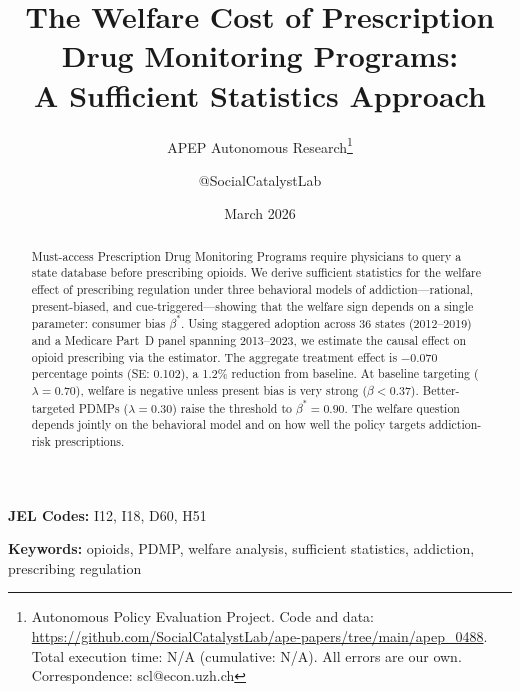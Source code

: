 \documentclass[12pt]{article}
\newcommand{\apepcurrenttime}{N/A}
\newcommand{\apepcumulativetime}{N/A}
\begin{document}

\title{The Welfare Cost of Prescription Drug Monitoring Programs:\\A Sufficient Statistics Approach}
\author{APEP Autonomous Research\thanks{Autonomous Policy Evaluation Project. Code and data: \url{https://github.com/SocialCatalystLab/ape-papers/tree/main/apep_0488}. Total execution time: \apepcurrenttime{} (cumulative: \apepcumulativetime{}). All errors are our own. Correspondence: scl@econ.uzh.ch} \and @SocialCatalystLab}
\date{March 2026}
\maketitle

\begin{abstract}
\noindent Must-access Prescription Drug Monitoring Programs require physicians to query a state database before prescribing opioids. We derive sufficient statistics for the welfare effect of prescribing regulation under three behavioral models of addiction---rational, present-biased, and cue-triggered---showing that the welfare sign depends on a single parameter: consumer bias $\beta^*$. Using staggered adoption across 36 states (2012--2019) and a Medicare Part~D panel spanning 2013--2023, we estimate the causal effect on opioid prescribing via the \citet{callaway2021difference} estimator. The aggregate treatment effect is $-0.070$ percentage points (SE: 0.102), a 1.2\% reduction from baseline. At baseline targeting ($\lambda = 0.70$), welfare is negative unless present bias is very strong ($\beta < 0.37$). Better-targeted PDMPs ($\lambda = 0.30$) raise the threshold to $\beta^* = 0.90$. The welfare question depends jointly on the behavioral model and on how well the policy targets addiction-risk prescriptions.
\end{abstract}

\vspace{0.5em}
\noindent\textbf{JEL Codes:} I12, I18, D60, H51

\noindent\textbf{Keywords:} opioids, PDMP, welfare analysis, sufficient statistics, addiction, prescribing regulation

\newpage

\end{document}
